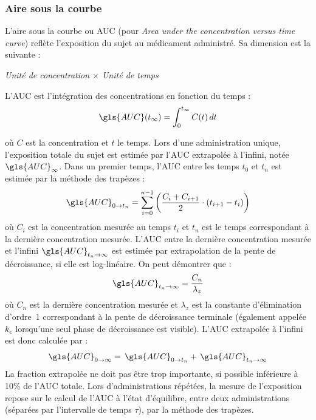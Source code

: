 \subsubsection{Aire sous la courbe}
L'aire sous la courbe ou \gls{AUC} (pour \textit{Area under the concentration versus time curve}) reflète l'exposition du sujet au médicament administré. Sa dimension est la suivante :

\begin{center}
\textit{Unité de concentration $\times$ Unité de temps}
\end{center}

L'\gls{AUC} est l'intégration des concentrations en fonction du temps :
\begin{equation}
\gls{AUC}(t_\infty)=\int_{0}^{t_\infty}C(t) \, dt
\label{eq:1}
\end{equation}

où $C$ est la concentration et $t$ le temps. Lors d'une administration unique, l'exposition totale du sujet est estimée par l'\gls{AUC} extrapolée à l'infini, notée $\gls{AUC}_\infty$. Dans un premier temps, l'\gls{AUC} entre les temps $t_0$ et $t_n$ est estimée par la méthode des trapèzes :
\begin{equation}
\gls{AUC}_{0 \to t_n} = \sum_{i=0}^{n-1}\left ( \frac{C_i + C_{i+1}}{2}\cdot \left ( t_{i+1}-t_i \right ) \right )
\label{eq:2}
\end{equation}
où $C_i$ est la concentration mesurée au temps $t_i$ et $t_n$ est le temps correspondant à la dernière concentration mesurée. L'\gls{AUC} entre la dernière concentration mesurée et l'infini $\gls{AUC}_{t_{n} \to \infty}$ est estimée par extrapolation de la pente de décroissance, si elle est log-linéaire. On peut démontrer que :
\begin{equation}
\gls{AUC}_{t_n \to \infty} = \frac{C_n}{\lambda_z}
\label{eq:3}
\end{equation}
où $C_n$ est la dernière concentration mesurée et $\lambda_z$ est la constante d'élimination d'ordre~1 correspondant à la pente de décroissance terminale (également appelée $k_e$ lorsqu'une seul phase de décroissance est visible). L'\gls{AUC} extrapolée à l'infini est donc calculée par :
\begin{equation}
\gls{AUC}_{0 \to \infty} =\, \gls{AUC}_{0 \to t_n} + \, \gls{AUC}_{t_n \to \infty}
\label{eq:4}
\end{equation}
La fraction extrapolée ne doit pas être trop importante, si possible inférieure à 10\% de l'\gls{AUC} totale. Lors d'administrations répétées, la mesure de l'exposition repose sur le calcul de l'\gls{AUC} à l'état d'équilibre, entre deux administrations (séparées par l'intervalle de temps $\tau$), par la méthode des trapèzes.


